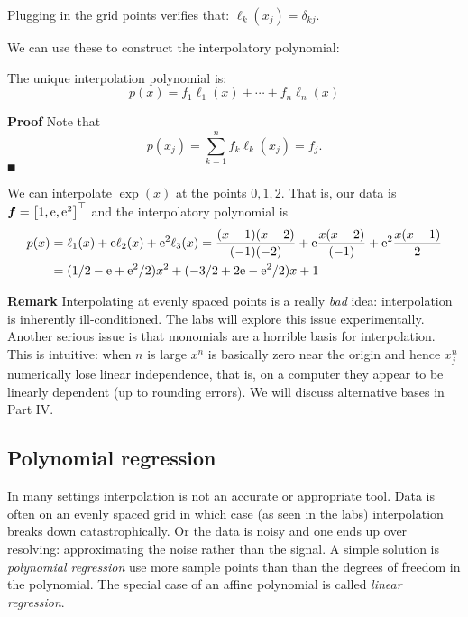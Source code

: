 Plugging in the grid points verifies that: $\ensuremath{\ell}_k(x_j) = \ensuremath{\delta}_{kj}$.

We can use these to construct the interpolatory polynomial:

\begin{theorem} The unique interpolation polynomial is:
\[
p(x) = f_1 \ensuremath{\ell}_1(x) + \ensuremath{\cdots} + f_n \ensuremath{\ell}_n(x)
\]
\end{theorem}
\textbf{Proof} Note that
\[
p(x_j) = \ensuremath{\sum}_{k=1}^n f_k \ensuremath{\ell}_k(x_j) = f_j.
\]
\ensuremath{\QED}

\begin{example} We can interpolate $\exp(x)$ at the points $0,1,2$. That is, our data is $\ensuremath{\bm{\f}} = \vectt[1, {\rm e},{\rm e}^2]$ and the interpolatory polynomial is
\begin{align*}
p(x) &= \ensuremath{\ell}_1(x) + {\rm e} \ensuremath{\ell}_2(x) + {\rm e}^2 \ensuremath{\ell}_3(x) =
{(x - 1) (x-2) \over (-1)(-2)} + {\rm e} {x (x-2) \over (-1)} +
{\rm e}^2 {x (x-1) \over 2} \\
&= (1/2 - {\rm e} +{\rm e}^2/2)x^2 + (-3/2 + 2 {\rm e}  - {\rm e}^2 /2) x + 1
\end{align*}
\end{example}

\textbf{Remark} Interpolating at evenly spaced points is a really \emph{bad} idea: interpolation is inherently ill-conditioned. The labs will explore this issue experimentally. Another serious issue is that monomials are a horrible basis for interpolation. This is intuitive: when $n$ is large $x^n$ is basically zero near the origin and hence $x_j^n$ numerically lose linear independence, that is, on a computer they appear to be linearly dependent (up to rounding errors). We will discuss alternative bases in Part IV.

\subsection{Polynomial regression}
In many settings interpolation is not an accurate or appropriate tool. Data is often on an evenly spaced grid in which case (as seen in the labs) interpolation breaks down catastrophically. Or the data is noisy and one ends up over resolving: approximating the noise rather than the signal. A simple solution is \emph{polynomial regression} use more sample points than than the degrees of freedom in the polynomial. The special case of an affine polynomial is called \emph{linear regression}.

